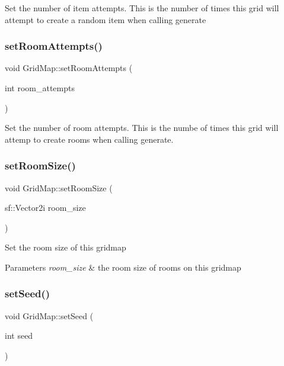 Set the number of item attempts. This is the number of times this grid will attempt to create a random item when calling generate \mbox{\label{classGridMap_a2537be44ba896d295fa89aa0edcbfb23}} 
\subsubsection{\texorpdfstring{set\+Room\+Attempts()}{setRoomAttempts()}}
{\footnotesize\ttfamily void Grid\+Map\+::set\+Room\+Attempts (\begin{DoxyParamCaption}\item[{int}]{room\+\_\+attempts }\end{DoxyParamCaption})}

Set the number of room attempts. This is the numbe of times this grid will attemp to create rooms when calling generate. \mbox{\label{classGridMap_acf8ffcc30d3d426914a0852d08a76ce8}} 
\subsubsection{\texorpdfstring{set\+Room\+Size()}{setRoomSize()}}
{\footnotesize\ttfamily void Grid\+Map\+::set\+Room\+Size (\begin{DoxyParamCaption}\item[{sf\+::\+Vector2i}]{room\+\_\+size }\end{DoxyParamCaption})}

Set the room size of this gridmap


\begin{DoxyParams}{Parameters}
{\em room\+\_\+size} & the room size of rooms on this gridmap \\
\hline
\end{DoxyParams}
\mbox{\label{classGridMap_a470864ae50feb66b442e1efbbdcbef7f}} 
\subsubsection{\texorpdfstring{set\+Seed()}{setSeed()}}
{\footnotesize\ttfamily void Grid\+Map\+::set\+Seed (\begin{DoxyParamCaption}\item[{int}]{seed }\end{DoxyParamCaption})}

